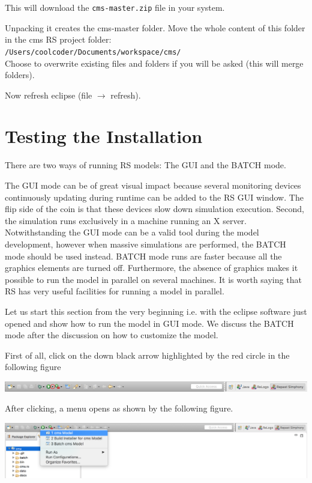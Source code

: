 \documentclass{article}
\begin{document}
This will download the \verb+cms-master.zip+ file in your system.

Unpacking it creates the cms-master folder.
Move the whole content of this folder in the cms RS project folder:\\  
\verb+/Users/coolcoder/Documents/workspace/cms/+\\
Choose to overwrite existing files and folders if you will be asked (this will merge folders). 

Now refresh eclipse (file $\rightarrow$ refresh).


\section{Testing the Installation}


There are two ways of running RS models: The GUI and the BATCH mode.

The GUI mode can be of great visual impact because several monitoring devices continuously updating during runtime can be added to the RS GUI window. The flip side of the coin is that these devices slow down simulation execution. Second, the simulation runs exclusively in a machine running an X server. Notwithstanding the GUI mode can be a valid tool during the model development, however when massive simulations are performed, the BATCH mode should be used instead. BATCH mode runs are faster because all the graphics elements are turned off. Furthermore, the absence of graphics makes it possible to run the model in parallel on several machines. It is worth saying that RS has very useful facilities for running a model in parallel.


Let us start this section from the very beginning i.e. with the eclipse software just opened and show how to run the model in GUI mode. 
We discuss the BATCH mode after the discussion on how to customize the model.

First of all, click on the down black arrow highlighted by the red circle in the following figure

\vskip2mm
\noindent
\includegraphics[scale=0.35]{fig_cms_rs_execution1}

After clicking, a menu opens as shown by the following figure. 

\vskip2mm
\noindent
\includegraphics[scale=0.35]{fig_cms_rs_execution2}
\end{document}
